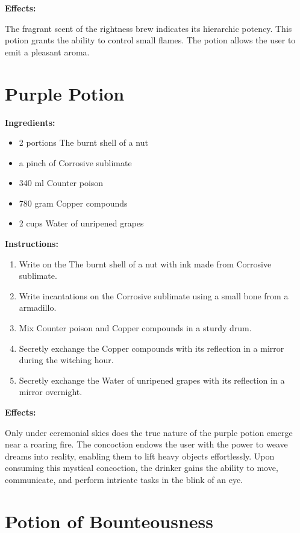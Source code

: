 \documentclass{article}
\begin{document}
\textbf{Effects:}

The fragrant scent of the rightness brew indicates its hierarchic potency. This potion grants the ability to control small flames. The potion allows the user to emit a pleasant aroma.

\newpage
\section*{Purple Potion}

\textbf{Ingredients:}

\begin{itemize}
  \item 2 portions The burnt shell of a nut
  \item a pinch of Corrosive sublimate
  \item 340 ml Counter poison
  \item 780 gram Copper compounds
  \item 2 cups Water of unripened grapes
\end{itemize}

\textbf{Instructions:}

\begin{enumerate}
  \item Write on the The burnt shell of a nut with ink made from Corrosive sublimate.
  \item Write incantations on the Corrosive sublimate using a small bone from a armadillo.
  \item Mix Counter poison and Copper compounds in a sturdy drum.
  \item Secretly exchange the Copper compounds with its reflection in a mirror during the witching hour.
  \item Secretly exchange the Water of unripened grapes with its reflection in a mirror overnight.
\end{enumerate}

\textbf{Effects:}

Only under ceremonial skies does the true nature of the purple potion emerge near a roaring fire. The concoction endows the user with the power to weave dreams into reality, enabling them to lift heavy objects effortlessly. Upon consuming this mystical concoction, the drinker gains the ability to move, communicate, and perform intricate tasks in the blink of an eye.

\newpage
\section*{Potion of Bounteousness}
\end{document}

